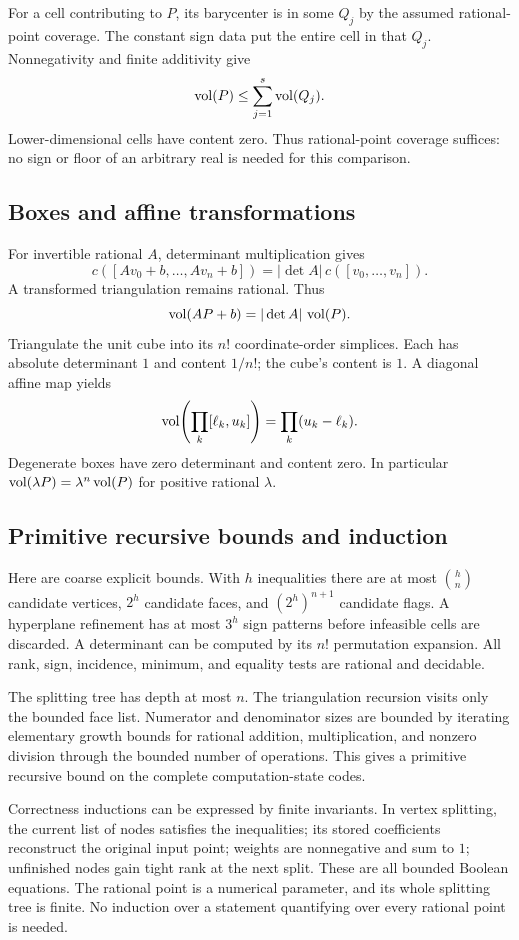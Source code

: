 For a cell contributing to \(P\), its
barycenter is in some \(Q_j\) by the assumed
rational-point coverage. The constant sign
data put the entire cell in that \(Q_j\).
Nonnegativity and finite additivity give
\[
                    \operatorname{vol}(P)\leq\sum_{j=1}^s\operatorname{vol}(Q_j).
\]
Lower-dimensional cells have content zero.
Thus rational-point coverage suffices:
no sign or floor of an arbitrary real is
needed for this comparison.

\subsection{Boxes and affine transformations}

For invertible rational \(A\), determinant
multiplication gives
\[
 c([Av_0+b,\ldots,Av_n+b])
       =|\det A|\,c([v_0,\ldots,v_n]).
\]
A transformed triangulation remains rational.
Thus
\[
                  \operatorname{vol}(AP+b)=|\det A|\,\operatorname{vol}(P).
\]
Triangulate the unit cube into its \(n!\)
coordinate-order simplices. Each has absolute
determinant \(1\) and content \(1/n!\);
the cube's content is \(1\).
A diagonal affine map yields
\[
 \operatorname{vol}\!\left(\prod_k[\ell_k,u_k]\right)
                         =\prod_k(u_k-\ell_k).
\]
Degenerate boxes have zero determinant and
content zero. In particular
\(\operatorname{vol}(\lambda P)=\lambda^n\operatorname{vol}(P)\)
for positive rational \(\lambda\).

\subsection{Primitive recursive bounds and induction}

Here are coarse explicit bounds. With \(h\)
inequalities there are at most
\(\binom hn\) candidate vertices,
\(2^h\) candidate faces, and
\((2^h)^{n+1}\) candidate flags.
A hyperplane refinement has at most \(3^h\)
sign patterns before infeasible cells are
discarded. A determinant can be computed by
its \(n!\) permutation expansion.
All rank, sign, incidence, minimum, and
equality tests are rational and decidable.

The splitting tree has depth at most \(n\).
The triangulation recursion visits only the
bounded face list. Numerator and denominator
sizes are bounded by iterating elementary
growth bounds for rational addition,
multiplication, and nonzero division through
the bounded number of operations.
This gives a primitive recursive bound on
the complete computation-state codes.

Correctness inductions can be expressed by
finite invariants. In vertex splitting, the
current list of nodes satisfies the inequalities;
its stored coefficients reconstruct the
original input point; weights are nonnegative
and sum to \(1\); unfinished nodes gain tight
rank at the next split. These are all bounded
Boolean equations. The rational point is a
numerical parameter, and its whole splitting
tree is finite. No induction over a statement
quantifying over every rational point is needed.

